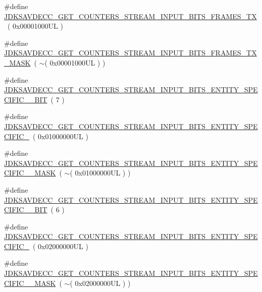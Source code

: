 \begin{DoxyCompactItemize}
\item 
\#define \hyperlink{group__get__counters__stream__input__bits_ga843f58101e8c814d3296a6f26c007a79}{J\+D\+K\+S\+A\+V\+D\+E\+C\+C\+\_\+\+G\+E\+T\+\_\+\+C\+O\+U\+N\+T\+E\+R\+S\+\_\+\+S\+T\+R\+E\+A\+M\+\_\+\+I\+N\+P\+U\+T\+\_\+\+B\+I\+T\+S\+\_\+\+F\+R\+A\+M\+E\+S\+\_\+\+TX}~( 0x00001000\+U\+L )
\item 
\#define \hyperlink{group__get__counters__stream__input__bits_ga362a04fcb484be0d53eccb17d9b2ce67}{J\+D\+K\+S\+A\+V\+D\+E\+C\+C\+\_\+\+G\+E\+T\+\_\+\+C\+O\+U\+N\+T\+E\+R\+S\+\_\+\+S\+T\+R\+E\+A\+M\+\_\+\+I\+N\+P\+U\+T\+\_\+\+B\+I\+T\+S\+\_\+\+F\+R\+A\+M\+E\+S\+\_\+\+T\+X\+\_\+\+M\+A\+SK}~( $\sim$( 0x00001000\+U\+L ) )
\item 
\#define \hyperlink{group__get__counters__stream__input__bits_gad41471a3e3fdeab5c55d4c56a626407a}{J\+D\+K\+S\+A\+V\+D\+E\+C\+C\+\_\+\+G\+E\+T\+\_\+\+C\+O\+U\+N\+T\+E\+R\+S\+\_\+\+S\+T\+R\+E\+A\+M\+\_\+\+I\+N\+P\+U\+T\+\_\+\+B\+I\+T\+S\+\_\+\+E\+N\+T\+I\+T\+Y\+\_\+\+S\+P\+E\+C\+I\+F\+I\+C\+\_\+\_\+\+B\+IT}~( 7 )
\item 
\#define \hyperlink{group__get__counters__stream__input__bits_gae84b6f31cfc12d4e98639ca1bb5b5e1d}{J\+D\+K\+S\+A\+V\+D\+E\+C\+C\+\_\+\+G\+E\+T\+\_\+\+C\+O\+U\+N\+T\+E\+R\+S\+\_\+\+S\+T\+R\+E\+A\+M\+\_\+\+I\+N\+P\+U\+T\+\_\+\+B\+I\+T\+S\+\_\+\+E\+N\+T\+I\+T\+Y\+\_\+\+S\+P\+E\+C\+I\+F\+I\+C\+\_}~( 0x01000000\+U\+L )
\item 
\#define \hyperlink{group__get__counters__stream__input__bits_ga01ca766ab29319bac37ff32ca7881fb4}{J\+D\+K\+S\+A\+V\+D\+E\+C\+C\+\_\+\+G\+E\+T\+\_\+\+C\+O\+U\+N\+T\+E\+R\+S\+\_\+\+S\+T\+R\+E\+A\+M\+\_\+\+I\+N\+P\+U\+T\+\_\+\+B\+I\+T\+S\+\_\+\+E\+N\+T\+I\+T\+Y\+\_\+\+S\+P\+E\+C\+I\+F\+I\+C\+\_\+\_\+\+M\+A\+SK}~( $\sim$( 0x01000000\+U\+L ) )
\item 
\#define \hyperlink{group__get__counters__stream__input__bits_gaa3c9b783a958a1c34fcdd1ae105c0915}{J\+D\+K\+S\+A\+V\+D\+E\+C\+C\+\_\+\+G\+E\+T\+\_\+\+C\+O\+U\+N\+T\+E\+R\+S\+\_\+\+S\+T\+R\+E\+A\+M\+\_\+\+I\+N\+P\+U\+T\+\_\+\+B\+I\+T\+S\+\_\+\+E\+N\+T\+I\+T\+Y\+\_\+\+S\+P\+E\+C\+I\+F\+I\+C\+\_\+\_\+\+B\+IT}~( 6 )
\item 
\#define \hyperlink{group__get__counters__stream__input__bits_ga4d9e8d90511c27838def3f865dd82b5e}{J\+D\+K\+S\+A\+V\+D\+E\+C\+C\+\_\+\+G\+E\+T\+\_\+\+C\+O\+U\+N\+T\+E\+R\+S\+\_\+\+S\+T\+R\+E\+A\+M\+\_\+\+I\+N\+P\+U\+T\+\_\+\+B\+I\+T\+S\+\_\+\+E\+N\+T\+I\+T\+Y\+\_\+\+S\+P\+E\+C\+I\+F\+I\+C\+\_}~( 0x02000000\+U\+L )
\item 
\#define \hyperlink{group__get__counters__stream__input__bits_ga3f4497fccfdae88c7046dffa49b793d3}{J\+D\+K\+S\+A\+V\+D\+E\+C\+C\+\_\+\+G\+E\+T\+\_\+\+C\+O\+U\+N\+T\+E\+R\+S\+\_\+\+S\+T\+R\+E\+A\+M\+\_\+\+I\+N\+P\+U\+T\+\_\+\+B\+I\+T\+S\+\_\+\+E\+N\+T\+I\+T\+Y\+\_\+\+S\+P\+E\+C\+I\+F\+I\+C\+\_\+\_\+\+M\+A\+SK}~( $\sim$( 0x02000000\+U\+L ) )

\end{DoxyCompactItemize}
